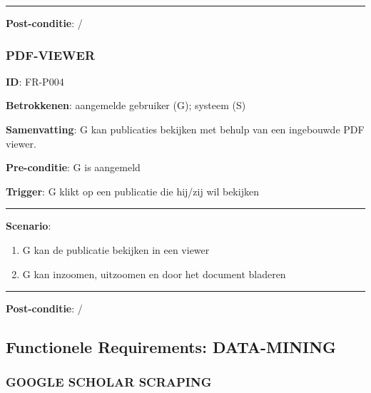 \vspace{2 mm}
\hrule
\vspace{4 mm}


\noindent \textbf{Post-conditie}: / \\


\subsubsection{PDF-VIEWER}
\vspace{2 mm}

\textbf{ID}: FR-P004
\vspace{2 mm}

\noindent \textbf{Betrokkenen}: aangemelde gebruiker (G); systeem (S) 
\vspace{2 mm}

\noindent \textbf{Samenvatting}: G kan publicaties bekijken met behulp van een ingebouwde PDF viewer. \vspace{2 mm}

\noindent \textbf{Pre-conditie}: G is aangemeld 
\vspace{2 mm}

\noindent \textbf{Trigger}: G klikt op een publicatie die hij/zij wil bekijken 
\vspace{4 mm}

\hrule
\vspace{2 mm}
\noindent \textbf{Scenario}:
\begin{enumerate}
\item  G kan de publicatie bekijken in een viewer
\item G kan inzoomen, uitzoomen en door het document bladeren 
\end{enumerate}
\vspace{2 mm}
\hrule
\vspace{4 mm}


\noindent \textbf{Post-conditie}: / \\




\clearpage




\subsection{Functionele Requirements: DATA-MINING}
\vspace{4 mm}


\subsubsection{GOOGLE SCHOLAR SCRAPING}
\vspace{2 mm}

